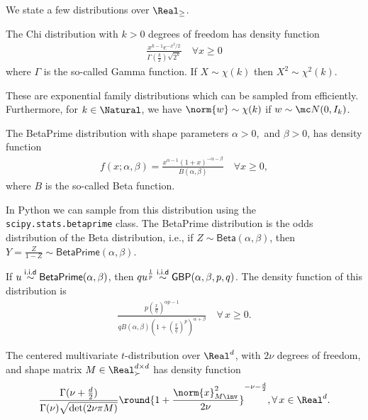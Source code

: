 \documentclass{article}
\theoremstyle{plain}
\begin{document}
We state a few distributions over $\Real_{\geq}$.

\begin{definition}\label{def:chi} The Chi distribution with $k>0$ degrees of freedom has density function
\begin{align}
    \frac{x^{k-1}e^{-x^2/2}}{\Gamma(\frac{k}2)\sqrt{2^{k}}} \quad \forall x\geq 0
\end{align}
where $\Gamma$ is the so-called Gamma function.
If $X\sim\chi(k)$ then $X^2\sim\chi^2(k).$
\end{definition}
These are exponential family distributions which can be sampled from efficiently. Furthermore, for $k\in\Natural$, we have $\norm{{w}}\sim\chi(k)$ if ${w}\sim\mc N(0,I_{k})$. 

\begin{definition}\label{def:beta-prime}
    The \textsf{BetaPrime} distribution with shape parameters $\alpha>0,$ and $ \beta>0$, has density function
    \begin{align*}
        f(x;\alpha,\beta) = \frac{x^{\alpha-1}(1+x)^{-\alpha-\beta}}{B(\alpha, \beta)}\quad \forall x\geq 0,
    \end{align*}
    where $B$ is the so-called Beta function.
\end{definition}

In Python we can  sample from this distribution using the \texttt{scipy.stats.betaprime} class. The \textsf{BetaPrime} distribution is the odds distribution of the Beta distribution, i.e., if $Z\sim \textsf{Beta}(\alpha, \beta)$, then $Y=\frac{Z}{1-Z}\sim \textsf{BetaPrime}(\alpha, \beta)$. 

\begin{definition}\label{sample_GBP}
    If $u\overset{\sf i.i.d}{\sim} \textsf{BetaPrime}(\alpha,\beta)$, then $qu^{\frac{1}{p}}\overset{\sf i.i.d}{\sim} \textsf{GBP}(\alpha, \beta, p, q)$. The density function of this distribution is
    \begin{align*}
        \frac{p\left(\frac{x}{q}\right)^{\alpha p-1}}{qB(\alpha, \beta)\left(1+\left(\frac{x}{q}\right)^p\right)^{\alpha + \beta}}\quad\forall\,x\geq0.
    \end{align*}
\end{definition}

\begin{definition}
    The centered multivariate $t$-distribution over $\Real^d$, with $2\nu$ degrees of freedom, and shape matrix $M \in \Real^{d\times d}_\succ$ has density function 
\begin{align*}
    \frac {\Gamma(\nu +\frac{d}2)}{\Gamma (\nu)\sqrt{\det(2\nu\pi M)}}\round{1+{\frac {\norm{x}^2_{M\inv}}{2\nu }}}^{-\nu-\frac{d}2}, \forall\, x\in\Real^d.
\end{align*} 
\end{definition}
\end{document}
